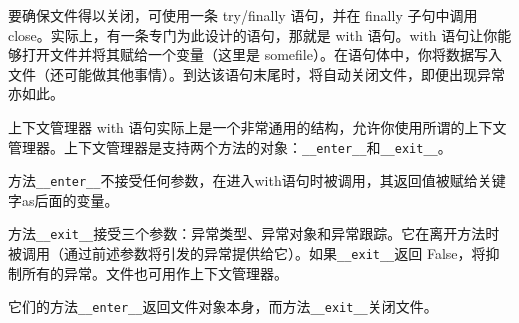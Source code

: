 要确保文件得以关闭，可使用一条 try/finally 语句，并在 finally 子句中调用 close。实际上，有一条专门为此设计的语句，那就是 with 语句。with 语句让你能够打开文件并将其赋给一个变量（这里是 somefile）。在语句体中，你将数据写入文件（还可能做其他事情）。到达该语句末尾时，将自动关闭文件，即便出现异常亦如此。

\begin{tcolorbox}[title=上下文管理器]
    上下文管理器 with 语句实际上是一个非常通用的结构，允许你使用所谓的上下文管理器。上下文管理器是支持两个方法的对象：\verb|__enter__|和\verb|__exit__|。

    方法\verb|__enter__|不接受任何参数，在进入with语句时被调用，其返回值被赋给关键字as后面的变量。

    方法\verb|__exit__|接受三个参数：异常类型、异常对象和异常跟踪。它在离开方法时被调用（通过前述参数将引发的异常提供给它）。如果\verb|__exit__|返回 False，将抑制所有的异常。文件也可用作上下文管理器。

    它们的方法\verb|__enter__|返回文件对象本身，而方法\verb|__exit__|关闭文件。
\end{tcolorbox}